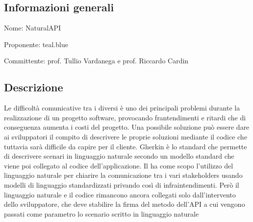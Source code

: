 \documentclass[../studio-di-fattibilita.tex]{subfiles}
\begin{document}
\subsection{Informazioni generali}%
\label{sub:informazioni_generale}
\begin{description}
  \item Nome: NaturalAPI
  \item Proponente: teal.blue
  \item Committente: prof. Tullio Vardanega e prof. Riccardo Cardin
\end{description}

\subsection{Descrizione}%
\label{descrizione}
Le difficoltà comunicative tra i diversi  è uno dei principali problemi durante la realizzazione di un progetto software, provocando frantendimenti e ritardi che di conseguenza aumenta i costi del progetto. Una possibile soluzione può essere dare ai sviluppatori il compito di descrivere le proprie soluzioni mediante il codice che tuttavia sarà difficile da capire per il cliente. Gherkin è lo standard che permette di descrivere scenari in linguaggio naturale secondo un modello standard che viene poi collegato al codice dell'applicazione. Il  ha come scopo l'utilizzo del linguaggio naturale per chiarire la comunicazione tra i vari stakeholders usando modelli di linguaggio standardizzati privando così di infraintendimenti. Però il linguaggio naturale e il codice rimancono ancora collegati solo dall'intervento dello sviluppatore, che deve stabilire la firma del metodo dell'API a cui vengono passati come parametro lo scenario scritto in linguaggio naturale
\end{document}
